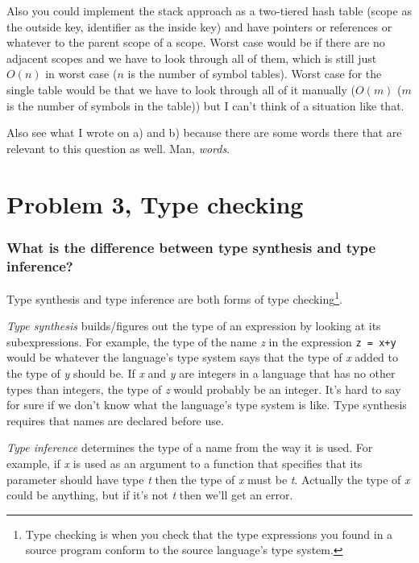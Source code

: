 Also you could implement the stack approach as a two-tiered hash table (scope as the outside key, identifier as the inside key) and have pointers or references or whatever to the parent scope of a scope.
Worst case would be if there are no adjacent scopes and we have to look through all of them, which is still just $O(n)$ in worst case ($n$ is the number of symbol tables).
Worst case for the single table would be that we have to look through all of it manually ($O(m)$ ($m$ is the number of symbols in the table)) but I can't think of a situation like that.

Also see what I wrote on a) and b) because there are some words there that are relevant to this question as well.
Man, \emph{words}.

\newpage
\setcounter{subsubsection}{0}
\section{Problem 3, Type checking}
\subsubsection{What is the difference between type synthesis and type inference?}
Type synthesis and type inference are both forms of type checking\footnote{Type checking is when you check that the type expressions you found in a source program conform to the source language's type system.}.

\emph{Type synthesis} builds/figures out the type of an expression by looking at its subexpressions.
For example, the type of the name \emph{z} in the expression \texttt{z = x+y} would be whatever the language's type system says that the type of \emph{x} added to the type of \emph{y} should be.
If \emph{x} and \emph{y} are integers in a language that has no other types than integers, the type of \emph{z} would probably be an integer.
It's hard to say for sure if we don't know what the language's type system is like.
Type synthesis requires that names are declared before use.

\emph{Type inference} determines the type of a name from the way it is used.
For example, if \emph{x} is used as an argument to a function that specifies that its parameter should have type \emph{t} then the type of \emph{x} must be \emph{t}.
Actually the type of \emph{x} could be anything, but if it's not \emph{t} then we'll get an error.

